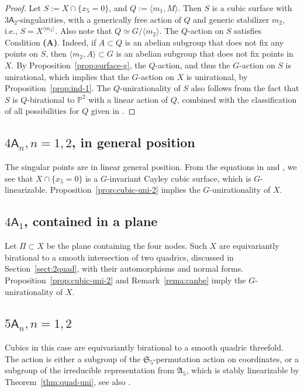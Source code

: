 \documentclass[12pt,reqno]{amsart}
\theoremstyle{plain}
\theoremstyle{remark}
\theoremstyle{definition}
\numberwithin{equation}{section}
\def\sA{{\mathsf A}}
\def\fA{{\mathfrak A}}
\def\fS{{\mathfrak S}}
\def\fS{{\mathfrak S}}
\begin{document}
\begin{proof}
Let $S:=X\cap\{x_5=0\}$, and $Q:=\langle m_1, M\rangle$. Then $S$ is a cubic surface with $3\sA_2$-singularities, with a generically free action of $Q$ and generic stabilizer $m_2$, i.e., 
$S=X^{\langle m_2\rangle}$. Also note that $Q\simeq G/\langle m_2 \rangle$. The $Q$-action on $S$ satisfies Condition {\bf (A)}. Indeed, if $A\subset Q$ is an abelian subgroup that does not fix any points on $S$, then $\langle m_2, A\rangle\subset G$ is an abelian subgroup that does not fix points in $X$. By Proposition~\ref{prop:surface-g}, the $Q$-action, and thus the $G$-action on $S$ is unirational, which implies that the $G$-action on $X$ is unirational, by Proposition~\ref{prop:ind-1}. The $Q$-unirationality of $S$ also follows from the fact that $S$ is $Q$-birational to $\mathbb{P}^2$ with a linear action of $Q$, combined with the classification of all possibilities for $Q$ given in \cite[Theorem~4.7]{DI}. 
\end{proof}

\subsection*{$4\sA_n, n=1,2$, in general position}
The singular points are in linear general position. From the equations in \cite[Section 5]{CTZ-cubic} and \cite[Section 7]{CMTZ}, we see that $X\cap \{ x_5=0\}$ is a $G$-invariant Cayley cubic surface, which is $G$-linearizable. 
Proposition~\ref{prop:cubic-uni-2} implies the $G$-unirationality of $X$.  


\subsection*{$4\sA_1$, contained in a plane}
Let $\Pi\subset X$ be the plane containing the four nodes. 
Such $X$ are equivariantly birational to a smooth intersection of two quadrics, discussed in Section~\ref{sect:2quad}, with their automorphisms and normal forms. 
Proposition~\ref{prop:cubic-uni-2} and Remark~\ref{rema:canbe} imply the $G$-unirationality of $X$. 


\subsection*{$5\sA_n, n=1,2$}
Cubics in this case are equivariantly birational to a smooth quadric threefold. The action is either a subgroup of the $\fS_5$-permutation action on coordinates, or a subgroup of the irreducible representation from $\fA_5$, which is stably linearizable by Theorem~\ref{thm:quad-uni}, see also \cite[Proposition 6.2]{HT-quadric}. 
\end{document}
